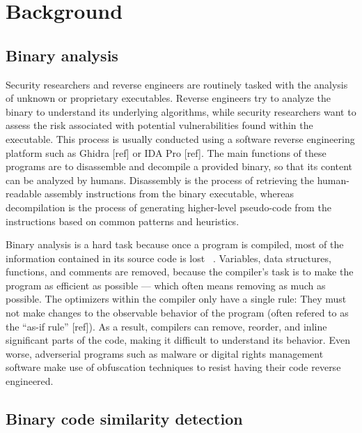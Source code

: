 \documentclass[conference,compsoc]{IEEEtran}
\begin{document}
\section{Background}

\subsection{Binary analysis}

Security researchers and reverse engineers are routinely tasked with the analysis of unknown or proprietary executables.
Reverse engineers try to analyze the binary to understand its underlying algorithms, while security researchers want to assess
the risk associated with potential vulnerabilities found within the executable. This process is usually conducted using
a software reverse engineering platform such as Ghidra [ref] or IDA Pro [ref]. The main functions of these programs are to
disassemble and decompile a provided binary, so that its content can be analyzed by humans. Disassembly is
the process of retrieving the human-readable assembly instructions from the binary executable, whereas decompilation
is the process of generating higher-level pseudo-code from the instructions based on common patterns and heuristics.

Binary analysis is a hard task because once a program is compiled, most of the information contained in its source code
is lost ~\cite{BCSDsurvey}. Variables, data structures, functions, and comments are removed, because the compiler's task is to make
the program as efficient as possible --- which often means removing as much as possible. The optimizers within the compiler
only have a single rule: They must not make changes to the observable behavior of the program (often refered
to as the ``as-if rule'' [ref]). As a result, compilers can remove, reorder, and inline significant parts of the code, making
it difficult to understand its behavior. Even worse, adverserial programs such as malware or digital rights management software
make use of obfuscation techniques to resist having their code reverse engineered.

\subsection{Binary code similarity detection}
\end{document}
